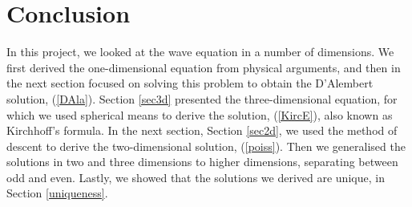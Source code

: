 \documentclass[a4paper, 12pt]{article}
\numberwithin{equation}{section}
\begin{document}
\section{Conclusion}

In this project, we looked at the wave equation  in a number of dimensions. We
first derived the one-dimensional equation from physical arguments, and then in
the next section focused on solving this problem to obtain the D'Alembert
solution, (\ref{DAla}). Section \ref{sec3d} presented the three-dimensional
equation, for which we used spherical means to derive the solution,
(\ref{KircE}), also known as Kirchhoff's formula. In the next section, Section
\ref{sec2d}, we used the method of descent to derive the two-dimensional
solution, (\ref{poiss}). Then we generalised the solutions in two and three
dimensions to higher dimensions, separating between odd and even. Lastly, we
showed that the solutions we derived are unique, in Section \ref{uniqueness}.

\newpage 



\end{document}
